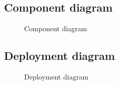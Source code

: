 \subsection {Component diagram}
\vspace*{1.5cm}
\begin{figure}[htb]
\centering
\setlength\fboxsep{0pt}
\setlength\fboxrule{0.5pt}
\caption{Component diagram}
\label{fig:compdiag}
\end{figure}

\newpage
\subsection {Deployment diagram}
\vspace*{1.0cm}
\begin{figure}[htb]
\centering
\setlength\fboxsep{0pt}
\setlength\fboxrule{0.5pt}
\caption{Deployment diagram}
\label{fig:deploydiag}
\end{figure}

